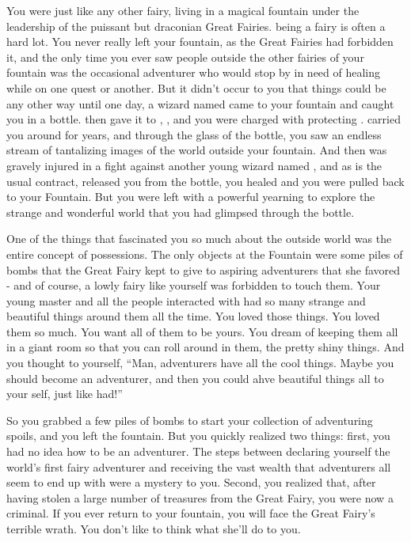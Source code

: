 \documentclass[char]{Katmeers}
\begin{document}
\name{\cFairy{}}



You were just like any other fairy, living in a magical fountain under the leadership of the puissant but draconian Great Fairies. being a fairy is often a hard lot. You never really left your fountain, as the Great Fairies had forbidden it, and the only time you ever saw people outside the other fairies of your fountain was the occasional adventurer who would stop by in need of healing while on one quest or another. But it didn't occur to you that things could be any other way until one day, a wizard named \cMalfoy{\formal} came to your fountain and caught you in a bottle. \cMalfoy{\They} then gave it to \cMalfoy{\their} \cMalfoy{\offspring}, \cMalfoy{}, and you were charged with protecting \cMalfoy{\them}. \cMalfoy{\They} carried you around for years, and through the glass of the bottle, you saw an endless stream of tantalizing images of the world outside your fountain. And then \cMalfoy{} was gravely injured in a fight against another young wizard named \cHarry{}, and as is the usual contract, \cMalfoy{} released you from the bottle, you healed \cMalfoy{\them} and you were pulled back to your Fountain. But you were left with a powerful yearning to explore the strange and wonderful world that you had glimpsed through the bottle.

One of the things that fascinated you so much about the outside world was the entire concept of possessions. The only objects at the Fountain were some piles of bombs that the Great Fairy kept to give to aspiring adventurers that she favored - and of course, a lowly fairy like yourself was forbidden to touch them. Your young master and all the people \cMalfoy{\they} interacted with had so many strange and beautiful things around them all the time. You loved those things. You loved them so much. You want all of them to be yours. You dream of keeping them all in a giant room so that you can roll around in them, the pretty shiny things. And you thought to yourself, ``Man, adventurers have all the cool things. Maybe you should become an adventurer, and then you could ahve beautiful things all to your self, just like \cMalfoy{\formal} had!''

So you grabbed a few piles of bombs to start your collection of adventuring spoils, and you left the fountain. But you quickly realized two things: first, you had no idea how to be an adventurer. The steps between declaring yourself the world's first fairy adventurer and receiving the vast wealth that adventurers all seem to end up with were a mystery to you. Second, you realized that, after having stolen a large number of treasures from the Great Fairy, you were now a criminal. If you ever return to your fountain, you will face the Great Fairy's terrible wrath. You don't like to think what she'll do to you.
\end{document}
